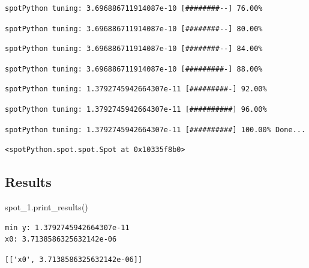 \documentclass[
  letterpaper,
  DIV=11,
  numbers=noendperiod]{scrreprt}
\newenvironment{Shaded}{\begin{snugshade}}{\end{snugshade}}
\newcommand{\NormalTok}[1]{\textcolor[rgb]{0.00,0.23,0.31}{#1}}
\begin{document}
\begin{verbatim}
spotPython tuning: 3.696886711914087e-10 [########--] 76.00% 
\end{verbatim}

\begin{verbatim}
spotPython tuning: 3.696886711914087e-10 [########--] 80.00% 
\end{verbatim}

\begin{verbatim}
spotPython tuning: 3.696886711914087e-10 [########--] 84.00% 
\end{verbatim}

\begin{verbatim}
spotPython tuning: 3.696886711914087e-10 [#########-] 88.00% 
\end{verbatim}

\begin{verbatim}
spotPython tuning: 1.3792745942664307e-11 [#########-] 92.00% 
\end{verbatim}

\begin{verbatim}
spotPython tuning: 1.3792745942664307e-11 [##########] 96.00% 
\end{verbatim}

\begin{verbatim}
spotPython tuning: 1.3792745942664307e-11 [##########] 100.00% Done...
\end{verbatim}

\begin{verbatim}
<spotPython.spot.spot.Spot at 0x10335f8b0>
\end{verbatim}

\hypertarget{results-3}{%
\subsection{Results}\label{results-3}}

\begin{Shaded}
\begin{Highlighting}[]
\NormalTok{spot\_1.print\_results()}
\end{Highlighting}
\end{Shaded}

\begin{verbatim}
min y: 1.3792745942664307e-11
x0: 3.7138586325632142e-06
\end{verbatim}

\begin{verbatim}
[['x0', 3.7138586325632142e-06]]
\end{verbatim}
\end{document}
